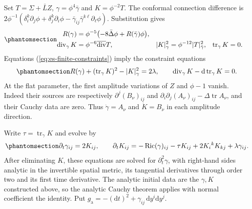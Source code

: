 \documentclass[
  english,
  11pt,
  reqno]{amsart}
\begin{document}
Set \(T=\Sigma+\bar LZ\), \(\gamma=\phi^4\bar\gamma\) and
\(K=\phi^{-2}T\). The conformal connection difference is
\(2\phi^{-1}(\delta_i^k\partial_j\phi+\delta_j^k\partial_i\phi-\bar\gamma_{ij}\bar\gamma^{k\ell}\partial_\ell\phi)\).
Substitution gives
\begin{equation}\protect\phantomsection\label{eq:es-finite-conformal-identities}{
 \begin{aligned}
 R(\gamma)&=\phi^{-5}\bigl(-8\bar\Delta\phi+R(\bar\gamma)\phi\bigr),\\
 \operatorname{div}_\gamma K
   &=\phi^{-6}\overline{\operatorname{div}}T,&
 |K|_\gamma^2&=\phi^{-12}|T|_{\bar\gamma}^2,&
 \operatorname{tr}_\gamma K&=0.
 \end{aligned}
}\end{equation} Equations (\ref{eq:es-finite-constraints}) imply the
constraint equations
\begin{equation}\protect\phantomsection\label{eq:es-finite-solved-constraints}{
 R(\gamma)+(\operatorname{tr}_\gamma K)^2-|K|_\gamma^2
       =2\lambda,
 \qquad
 \operatorname{div}_\gamma K
       -\mathrm d\operatorname{tr}_\gamma K=0.
}\end{equation} At the flat parameter, the first amplitude variations of
\(Z\) and \(\phi-1\) vanish. Indeed their sources are respectively
\(\partial^j(B_\nu)_{ij}\) and
\(\partial_i\partial_j(A_\nu)_{ij}-\Delta\operatorname{tr}A_\nu\), and
their Cauchy data are zero. Thus \(\dot\gamma=A_\nu\) and
\(\dot K=B_\nu\) in each amplitude direction.

Write \(\tau=\operatorname{tr}_\gamma K\) and evolve by
\begin{equation}\protect\phantomsection\label{eq:es-finite-gaussian-evolution}{
 \partial_t\gamma_{ij}=2K_{ij},\qquad
 \partial_tK_{ij}
   =-\operatorname{Ric}(\gamma)_{ij}
     -\tau K_{ij}+2K_i{}^kK_{kj}
     +\lambda\gamma_{ij}.
}\end{equation} After eliminating \(K\), these equations are solved for
\(\partial_t^2\gamma\), with right-hand sides analytic in the invertible
spatial metric, its tangential derivatives through order two and its
first time derivative. The analytic initial data are the \(\gamma,K\)
constructed above, so the analytic Cauchy theorem applies with normal
coefficient the identity. Put
\(g_{\mathrm a}=-(\mathrm dt)^2+\gamma_{ij}\,\mathrm dy^i\mathrm dy^j\).
\end{document}
